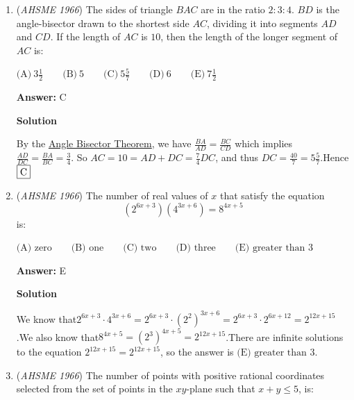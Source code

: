 \begin{enumerate}
 $\text{(A)} \ 2 \qquad \text{(B)} \ - 2 - \frac {3i\sqrt {3}}{4} \qquad \text{(C)} \ 0 \qquad \text{(D)} \ - \frac {3i\sqrt {3}}{4} \qquad \text{(E)} \ - 2$

 \textbf{Answer: }E



\textbf{Solution}

Let the two numbers be $a,b$; then $a^3 + b^3 = (a+b)(a^2 - ab + b^2) = (a+b)[(a+b)^2 -3ab]$ $= (1)[1^2 - 3 \cdot 1] = -2 \Rightarrow \mathrm{(E)}$.

 


	\item (\textit{AHSME 1966}) The sides of triangle $BAC$ are in the ratio $2: 3: 4$. $BD$ is the angle-bisector drawn to the shortest side $AC$, dividing it into segments $AD$ and $CD$. If the length of $AC$ is $10$, then the length of the longer segment of $AC$ is:


 $\text{(A)} \ 3\frac12 \qquad \text{(B)} \ 5 \qquad \text{(C)} \ 5\frac57 \qquad \text{(D)} \ 6 \qquad \text{(E)} \ 7\frac12$

 \textbf{Answer: }C



\textbf{Solution}

By the \href{https://artofproblemsolving.com/wiki/index.php?title=Angle\_Bisector\_Theorem}{Angle Bisector Theorem}, we have $\frac{BA}{AD}=\frac{BC}{CD}$ which implies $\frac{AD}{DC}=\frac{BA}{BC}=\frac{3}{4}$. So $AC=10=AD+DC=\frac{7}{4}DC$, and thus $DC=\frac{40}{7}=5\frac{5}{7}$.Hence$\fbox{C}$



	\item (\textit{AHSME 1966}) The number of real values of $x$ that satisfy the equation 
 \[(2^{6x+3})(4^{3x+6})=8^{4x+5}\] is:


 $\text{(A)  zero} \qquad \text{(B)  one} \qquad \text{(C)  two} \qquad \text{(D)  three} \qquad \text{(E)  greater than 3}$

 \textbf{Answer: }E



\textbf{Solution}

We know that$2^{6x+3}\cdot4^{3x+6}=2^{6x+3}\cdot(2^2)^{3x+6}=2^{6x+3}\cdot2^{6x+12}=2^{12x+15}$.We also know that$8^{4x+5}=(2^3)^{4x+5}=2^{12x+15}$.There are infinite solutions to the equation $2^{12x+15}=2^{12x+15}$, so the answer is $\boxed{\text{(E)  greater than 3}}$.

 


	\item (\textit{AHSME 1966}) The number of points with positive rational coordinates selected from the set of points in the $xy$-plane such that $x+y \le 5$, is:



\end{enumerate}
